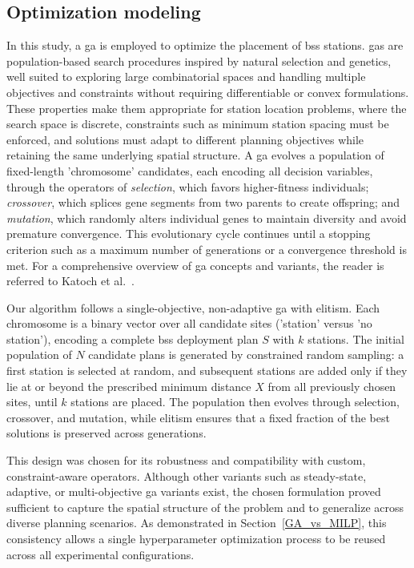     \subsection{Optimization modeling}
    \label{sec:GA}

    In this study, a \ac{ga} is employed to optimize the placement of \ac{bss} stations. \acp{ga} are population-based search procedures inspired by natural selection and genetics, well suited to exploring large combinatorial spaces and handling multiple objectives and constraints without requiring differentiable or convex formulations. These properties make them appropriate for station location problems, where the search space is discrete, constraints such as minimum station spacing must be enforced, and solutions must adapt to different planning objectives while retaining the same underlying spatial structure. A \ac{ga} evolves a population of fixed-length 'chromosome' candidates, each encoding all decision variables, through the operators of \textit{selection}, which favors higher-fitness individuals; \textit{crossover}, which splices gene segments from two parents to create offspring; and \textit{mutation}, which randomly alters individual genes to maintain diversity and avoid premature convergence. This evolutionary cycle continues until a stopping criterion such as a maximum number of generations or a convergence threshold is met. For a comprehensive overview of \ac{ga} concepts and variants, the reader is referred to Katoch et al.~\cite{Katoch2021}.

    Our algorithm follows a single-objective, non-adaptive \ac{ga} with elitism. Each chromosome is a binary vector over all candidate sites ('station' versus 'no station'), encoding a complete \ac{bss} deployment plan $S$ with $k$ stations. The initial population of $N$ candidate plans is generated by constrained random sampling: a first station is selected at random, and subsequent stations are added only if they lie at or beyond the prescribed minimum distance $X$ from all previously chosen sites, until $k$ stations are placed. The population then evolves through selection, crossover, and mutation, while elitism ensures that a fixed fraction of the best solutions is preserved across generations. 

    This design was chosen for its robustness and compatibility with custom, constraint-aware operators. Although other variants such as steady-state, adaptive, or multi-objective \ac{ga} variants exist, the chosen formulation proved sufficient to capture the spatial structure of the problem and to generalize across diverse planning scenarios. As demonstrated in Section~\ref{GA_vs_MILP}, this consistency allows a single hyperparameter optimization process to be reused across all experimental configurations.


